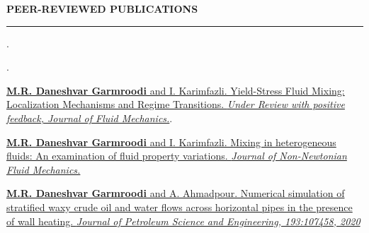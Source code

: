 \documentclass[10pt]{article}
\begin{document}
		\vspace{2.5mm}
		\noindent \textbf{\color{violet} PEER-REVIEWED PUBLICATIONS}
		
		\vspace{-2mm}
		
		\noindent\rule[0.5ex]{\linewidth}{1pt}
		
		
		
		.
		
		.
		
		\noindent \href{https://arxiv.org/pdf/2503.09359}{\textbf{M.R. Daneshvar Garmroodi} and I. Karimfazli. Yield-Stress Fluid Mixing: Localization Mechanisms and Regime Transitions.\textit{ Under Review with positive feedback, Journal of Fluid Mechanics.}}.
		
		\noindent \href{https://doi.org/10.1016/j.jnnfm.2024.105196}{\textbf{M.R. Daneshvar Garmroodi} and I. Karimfazli. Mixing in heterogeneous fluids: An examination of fluid property variations.\textit{ Journal of Non-Newtonian Fluid Mechanics.}}
		
		
		
		
		
		\noindent \href{https://doi.org/10.1016/j.petrol.2020.107458}{\textbf{M.R. Daneshvar Garmroodi} and A. Ahmadpour. Numerical simulation of stratified waxy crude oil and water flows across horizontal pipes in the presence of wall heating.\textit{ Journal of Petroleum Science and Engineering, 193:107458, 2020}}
		
\end{document}
